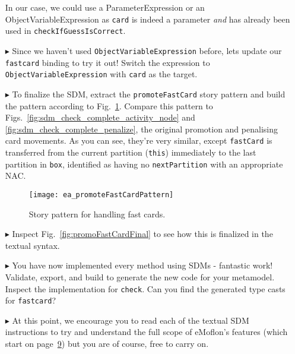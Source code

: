 \begin{itemize}
In our case, we could use a ParameterExpression or an ObjectVariableExpression as \texttt{card} is indeed a parameter \emph{and} has already been used in
\texttt{checkIfGuessIsCorrect}. 

\vspace{0.5cm}

\item[$\blacktriangleright$] Since we haven't used \texttt{ObjectVariableExpression} before, lets update our \texttt{fastcard} binding to try it out! Switch
the expression to \texttt{Object\-Vari\-able\-Ex\-pres\-sion} with \texttt{card} as the target. 

\clearpage

\item[$\blacktriangleright$] To finalize the SDM, extract the \texttt{promoteFastCard} story pattern and build the pattern according to
Fig.~\ref{fig:promoteFastCardPattern}. Compare this pattern to Figs.~\ref{fig:sdm_check_complete_activity_node} and \ref{fig:sdm_check_complete_penalize}, the
original promotion and penalising card movements. As you can see, they're very similar, except \texttt{fastCard} is transferred from the current partition
(\texttt{this}) immediately to the last partition in \texttt{box}, identified as having no \texttt{nextPartition} with an appropriate NAC.

\vspace{0.5cm}

\begin{figure}[htbp]
\begin{center}
  \texttt{[image: ea\_promoteFastCardPattern]}
  \caption{Story pattern for handling fast cards.}  
  \label{fig:promoteFastCardPattern}
\end{center}
\end{figure}

\vspace{0.5cm}

\item[$\blacktriangleright$] Inspect Fig.~\ref{fig:promoFastCardFinal} to see how this is finalized in the textual syntax.

\item[$\blacktriangleright$] You have now implemented every method using SDMs - fantastic work! Validate, export, and build
to generate the new code for your metamodel. Inspect the implementation for \texttt{check}.  Can you find the generated type casts for \texttt{fastcard}?

\item[$\blacktriangleright$] At this point, we encourage you to read each of the textual SDM instructions to try and understand the full scope of eMoflon's
features (which start on page~\hyperlink{page.9}{9}) but you are of course, free to carry on.


\end{itemize}
